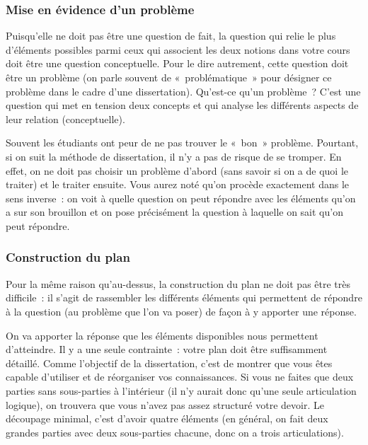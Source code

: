 \documentclass[
  letterpaper,
  DIV=11,
  numbers=noendperiod]{scrartcl}
\begin{document}
\subsubsection{Mise en évidence d'un
problème}\label{mise-en-uxe9vidence-dun-probluxe8me}

Puisqu'elle ne doit pas être une question de fait, la question qui relie
le plus d'éléments possibles parmi ceux qui associent les deux notions
dans votre cours doit être une question conceptuelle. Pour le dire
autrement, cette question doit être un problème (on parle souvent de
«~problématique~» pour désigner ce problème dans le cadre d'une
dissertation). Qu'est-ce qu'un problème~? C'est une question qui met en
tension deux concepts et qui analyse les différents aspects de leur
relation (conceptuelle).

Souvent les étudiants ont peur de ne pas trouver le «~bon~» problème.
Pourtant, si on suit la méthode de dissertation, il n'y a pas de risque
de se tromper. En effet, on ne doit pas choisir un problème d'abord
(sans savoir si on a de quoi le traiter) et le traiter ensuite. Vous
aurez noté qu'on procède exactement dans le sens inverse~: on voit à
quelle question on peut répondre avec les éléments qu'on a sur son
brouillon et on pose précisément la question à laquelle on sait qu'on
peut répondre.

\subsubsection{Construction du plan}\label{construction-du-plan}

Pour la même raison qu'au-dessus, la construction du plan ne doit pas
être très difficile~: il s'agit de rassembler les différents éléments
qui permettent de répondre à la question (au problème que l'on va poser)
de façon à y apporter une réponse.

On va apporter la réponse que les éléments disponibles nous permettent
d'atteindre. Il y a une seule contrainte~: votre plan doit être
suffisamment détaillé. Comme l'objectif de la dissertation, c'est de
montrer que vous êtes capable d'utiliser et de réorganiser vos
connaissances. Si vous ne faites que deux parties sans sous-parties à
l'intérieur (il n'y aurait donc qu'une seule articulation logique), on
trouvera que vous n'avez pas assez structuré votre devoir. Le découpage
minimal, c'est d'avoir quatre éléments (en général, on fait deux grandes
parties avec deux sous-parties chacune, donc on a trois articulations).
\end{document}
